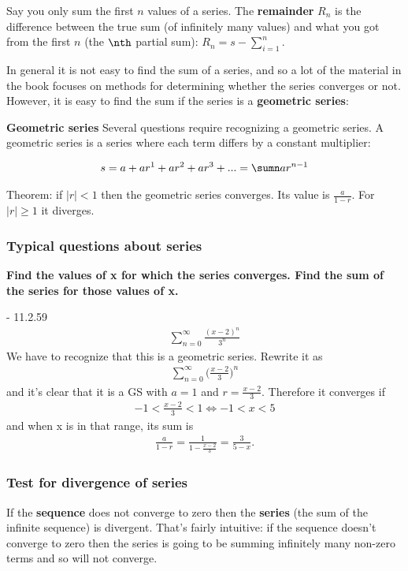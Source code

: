 Say you only sum the first $n$ values of a series. The \textbf{remainder} $R_n$ is the difference between the true sum (of infinitely many values) and what you got from the first $n$ (the $\nth$ partial sum): $R_n = s - \sum_{i=1}^n$.



In general it is not easy to find the sum of a series, and so a lot of the material in the book focuses on methods for determining whether the series converges or not. However, it is easy to find the sum if the series is a \textbf{geometric series}:

\textbf{Geometric series}
Several questions require recognizing a geometric series. A geometric series is a series where each term differs by a constant multiplier:

\begin{align*}
  s = a + ar^1 + ar^2 + ar^3 + ... = \sumn ar^{n-1}
\end{align*}

Theorem: if $|r| < 1$ then the geometric series converges. Its value is $\frac{a}{1-r}$. For $|r| \geq 1$ it diverges.

\subsubsection{Typical questions about series}

\textbf{Find the values of x for which the series converges. Find the sum of the series for those values of x.}

- 11.2.59
\begin{align*}
  \sum_{n=0}^{\infty} \frac{(x-2)^n}{3^n}
\end{align*}
We have to recognize that this is a geometric series. Rewrite it as
\begin{align*}
  \sum_{n=0}^{\infty} \Big(\frac{x-2}{3}\Big)^n
\end{align*}
and it's clear that it is a GS with $a=1$ and $r=\frac{x-2}{3}$. Therefore it converges if
\begin{align*}
  -1 < \frac{x-2}{3} < 1 \Leftrightarrow -1 < x < 5
\end{align*}
and when x is in that range, its sum is
\begin{align*}
  \frac{a}{1-r} = \frac{1}{1 - \frac{x-2}{3}} = \frac{3}{5-x}.
\end{align*}

\subsubsection{Test for divergence of series}
If the \textbf{sequence} does not converge to zero then the \textbf{series} (the sum of the infinite sequence) is divergent. That's fairly intuitive: if the sequence doesn't converge to zero then the series is going to be summing infinitely many non-zero terms and so will not converge.

